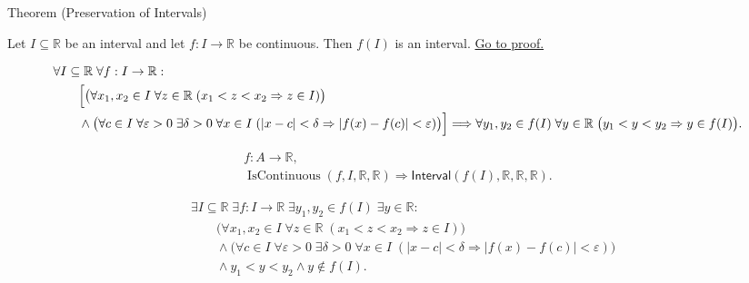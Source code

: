 
\begin{theorembox}{Theorem (Preservation of Intervals)}
\begin{theorem}
\label{thm:preservation-of-intervals}
Let $I \subseteq \mathbb{R}$ be an interval and let $f:I \to \mathbb{R}$ be continuous. Then $f(I)$ is an interval.
\hyperref[prf:preservation-of-intervals]{Go to proof.}
\end{theorem}
\end{theorembox}

\begin{remark*}
\[
\begin{aligned}
&\forall I\subseteq\mathbb{R}\;\forall f:I\to\mathbb{R}:\\
&\qquad
\Bigl[
\bigl(\forall x_1,x_2\in I\;\forall z\in\mathbb{R}\;(x_1<z<x_2\Rightarrow z\in I)\bigr)\\
&\qquad\land
\bigl(\forall c\in I\;\forall \varepsilon>0\;\exists \delta>0\;\forall x\in I\;
(|x-c|<\delta\Rightarrow |f(x)-f(c)|<\varepsilon)\bigr)
\Bigr]
\Longrightarrow
\forall y_1,y_2 \in f(I)\; \forall y \in \mathbb{R}\;
\bigl(y_1 < y < y_2 \Rightarrow y \in f(I)\bigr).
\end{aligned}
\]
\end{remark*}

\begin{remark*}
\[
\begin{aligned}
  f\colon A\to\mathbb{R},\\
\operatorname{IsContinuous}(f,I,\mathbb{R},\mathbb{R})
\Longrightarrow
\mathsf{Interval}(f(I),\mathbb{R},\mathbb{R},\mathbb{R}).
\end{aligned}
\]
\end{remark*}

\begin{remark*}
\[
\begin{aligned}
&\exists I\subseteq\mathbb{R}\;\exists f:I\to\mathbb{R}\;
\exists y_1,y_2\in f(I)\;\exists y\in\mathbb{R}:\\
&\qquad
\bigl(\forall x_1,x_2\in I\;\forall z\in\mathbb{R}\;(x_1<z<x_2\Rightarrow z\in I)\bigr)\\
&\qquad\land
\bigl(\forall c\in I\;\forall \varepsilon>0\;\exists \delta>0\;\forall x\in I\;
(|x-c|<\delta\Rightarrow |f(x)-f(c)|<\varepsilon)\bigr)\\
&\qquad\land
y_1<y<y_2
\land
y\notin f(I).
\end{aligned}
\]
\end{remark*}

